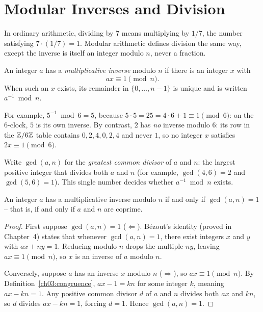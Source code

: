 \section{Modular Inverses and Division}

In ordinary arithmetic, dividing by $7$ means multiplying by $1/7$, the number satisfying $7 \cdot (1/7) = 1$. Modular arithmetic defines division the same way, except the inverse is itself an integer modulo $n$, never a fraction.

\begin{definition}
\label{ch03:inverse-def}
An integer $a$ has a \emph{multiplicative inverse} modulo $n$ if there is an integer $x$ with
\[
  a x \equiv 1 \pmod{n}.
\]
When such an $x$ exists, its remainder in $\{0, \dots, n-1\}$ is unique and is written $a^{-1} \bmod n$.
\end{definition}

For example, $5^{-1} \bmod 6 = 5$, because $5 \cdot 5 = 25 = 4\cdot 6 + 1 \equiv 1 \pmod{6}$: on the 6-clock, $5$ is its own inverse. By contrast, $2$ has \emph{no} inverse modulo $6$: its row in the $\mathbb{Z}/6\mathbb{Z}$ table contains $0,2,4,0,2,4$ and never $1$, so no integer $x$ satisfies $2x \equiv 1 \pmod{6}$.

Write $\gcd(a, n)$ for the \emph{greatest common divisor} of $a$ and $n$: the largest positive integer that divides both $a$ and $n$ (for example, $\gcd(4,6) = 2$ and $\gcd(5,6) = 1$). This single number decides whether $a^{-1} \bmod n$ exists.

\begin{theorem}
\label{ch03:inverse-exists}
An integer $a$ has a multiplicative inverse modulo $n$ if and only if $\gcd(a, n) = 1$ -- that is, if and only if $a$ and $n$ are coprime.
\end{theorem}

\begin{proof}
First suppose $\gcd(a,n) = 1$ ($\Leftarrow$). B\'ezout's identity (proved in Chapter~4) states that whenever $\gcd(a,n)=1$, there exist integers $x$ and $y$ with $ax + ny = 1$. Reducing modulo $n$ drops the multiple $ny$, leaving $ax \equiv 1 \pmod{n}$, so $x$ is an inverse of $a$ modulo $n$.

Conversely, suppose $a$ has an inverse $x$ modulo $n$ ($\Rightarrow$), so $ax \equiv 1 \pmod{n}$. By Definition~\ref{ch03:congruence}, $ax - 1 = kn$ for some integer $k$, meaning $ax - kn = 1$. Any positive common divisor $d$ of $a$ and $n$ divides both $ax$ and $kn$, so $d$ divides $ax - kn = 1$, forcing $d = 1$. Hence $\gcd(a,n) = 1$.
\end{proof}

